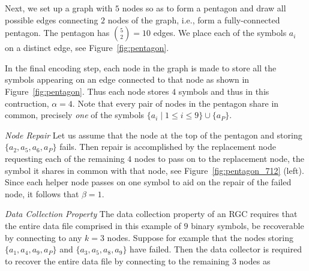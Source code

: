 \begin{multicols}{2}
Next, we set up a graph with $5$ nodes so as to form a pentagon and draw all possible edges connecting $2$ nodes of the graph, i.e., form a fully-connected pentagon. The pentagon has ${5 \choose 2}=10$ edges.  We place each of the symbols $a_i$ on a distinct edge, see Figure~\ref{fig:pentagon}.

In the final encoding step, each node in the graph is made to store all the symbols appearing on an edge connected to that node as shown in Figure~\ref{fig:pentagon}. Thus each node stores $4$ symbols and thus in this contruction, $\alpha=4$.  Note that every pair of nodes in the pentagon share in common, precisely {\em one} of the symbols $\{a_i \mid 1 \leq i \leq 9\} \cup \{a_P\}$.

{\em Node Repair} Let us assume that the node at the top of the pentagon and storing $\{a_2,a_5,a_6,a_P\}$ fails.  Then repair is accomplished by the replacement node requesting each of the remaining $4$ nodes to pass on to the replacement node, the symbol it shares in common with that node, see Figure~\ref{fig:pentagon_712} (left).  Since each helper node passes on one symbol to aid on the repair of the failed node, it follows that $\beta=1$.

{\parfillskip=0pt
{\em Data Collection Property} The data collection property of an RGC requires that the entire data file comprised in this example of $9$ binary symbols, be recoverable by connecting to any $k=3$ nodes.  Suppose for example that the nodes storing $\{a_1,a_4,a_9,a_P\}$ and $\{a_3,a_5,a_8,a_9\}$ have failed.  Then the data collector is required to recover the entire data file by connecting to the remaining $3$ nodes as\par}
\end{multicols}

\newpage

